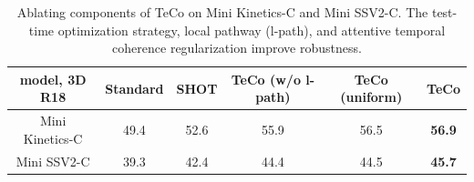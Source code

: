 \documentclass{article} %
\begin{document}
\begin{table}[t]

\caption{Ablating components of TeCo on Mini Kinetics-C and Mini SSV2-C. The test-time optimization strategy, local pathway (l-path), and attentive temporal coherence regularization improve robustness.}
\label{ablation-table}
\begin{center}
\begin{tabular}{c|c|c | c c c }
\toprule
model, 3D R18 & Standard & SHOT&  TeCo (w/o l-path) &  TeCo (uniform) & TeCo \\
\midrule
Mini Kinetics-C    &49.4 &52.6 &55.9& 56.5 & \textbf{56.9} \\
Mini SSV2-C & 39.3& 42.4& 44.4 & 44.5 & \textbf{45.7} \\
\bottomrule
\end{tabular}
\end{center}
\vspace{-0.7cm}
\end{table}



\end{document}
